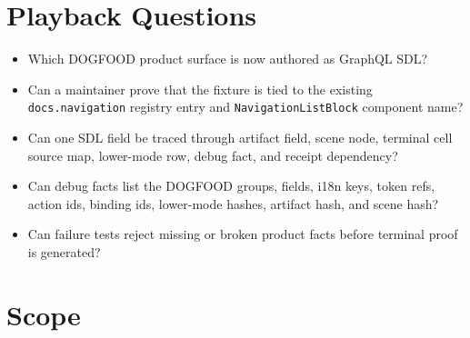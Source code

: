 \section{Playback Questions}\label{record-142-playback-questions}

\begin{itemize}
\tightlist
\item
  Which DOGFOOD product surface is now authored as GraphQL SDL?
\item
  Can a maintainer prove that the fixture is tied to the existing \texttt{d\allowbreak{}o\allowbreak{}c\allowbreak{}s\allowbreak{}.\allowbreak{}n\allowbreak{}a\allowbreak{}v\allowbreak{}i\allowbreak{}g\allowbreak{}a\allowbreak{}t\allowbreak{}i\allowbreak{}o\allowbreak{}n} registry entry and \texttt{N\allowbreak{}a\allowbreak{}v\allowbreak{}i\allowbreak{}g\allowbreak{}a\allowbreak{}t\allowbreak{}i\allowbreak{}o\allowbreak{}n\allowbreak{}L\allowbreak{}i\allowbreak{}s\allowbreak{}t\allowbreak{}B\allowbreak{}l\allowbreak{}o\allowbreak{}c\allowbreak{}k} component name?
\item
  Can one SDL field be traced through artifact field, scene node, terminal cell source map, lower-mode row, debug fact, and receipt dependency?
\item
  Can debug facts list the DOGFOOD groups, fields, i18n keys, token refs, action ids, binding ids, lower-mode hashes, artifact hash, and scene hash?
\item
  Can failure tests reject missing or broken product facts before terminal proof is generated?
\end{itemize}

\section{Scope}\label{record-142-scope}

